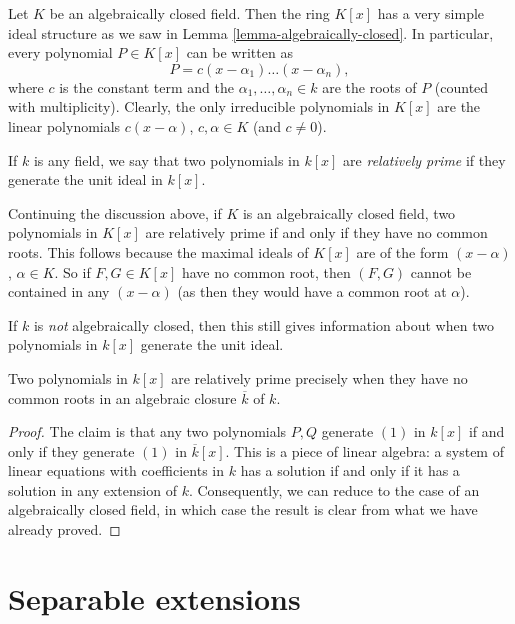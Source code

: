 \noindent
Let $K$ be an algebraically closed field. Then the ring $K[x]$ has a very
simple ideal structure as we saw in Lemma \ref{lemma-algebraically-closed}.
In particular, every polynomial $P \in K[x]$ can be written as
$$
P = c(x - \alpha_1) \ldots (x - \alpha_n),
$$
where $c$ is the constant term and the $\alpha_1, \ldots, \alpha_n \in k$
are the roots of $P$ (counted with multiplicity). Clearly, the only irreducible
polynomials in $K[x]$ are the linear polynomials $c(x - \alpha)$,
$c, \alpha \in K$ (and $c \neq 0$).

\begin{definition}
\label{definition-relatively-prime}
If $k$ is any field, we say that two polynomials in $k[x]$ are
{\it relatively prime} if they generate the unit ideal in $k[x]$.
\end{definition}

\noindent
Continuing the discussion above, if $K$ is an algebraically closed field,
two polynomials in $K[x]$ are relatively prime if and only if they have no
common roots. This follows because the maximal ideals of $K[x]$ are of the form
$(x - \alpha)$, $\alpha \in K$. So if $F, G \in K[x]$ have no common root,
then $(F, G)$ cannot be contained in any $(x - \alpha)$ (as then they would
have a common root at $\alpha$).

\medskip\noindent
If $k$ is {\it not} algebraically closed, then this still gives
information about when two polynomials in $k[x]$ generate the unit ideal.

\begin{lemma}
\label{lemma-relatively-prime-polynomials}
Two polynomials in $k[x]$ are relatively prime precisely when they
have no common roots in an algebraic closure $\overline{k}$ of $k$.
\end{lemma}

\begin{proof}
The claim is that any two polynomials $P, Q$ generate $(1)$ in $k[x]$ if and
only if they generate $(1)$ in $\overline{k}[x]$. This is a piece of
linear algebra: a system of linear equations with coefficients in $k$ has
a solution if and only if it has a solution in any extension of $k$.
Consequently, we can reduce to the case of an algebraically closed field, in
which case the result is clear from what we have already proved.
\end{proof}





\section{Separable extensions}
\label{section-separable-extensions}

